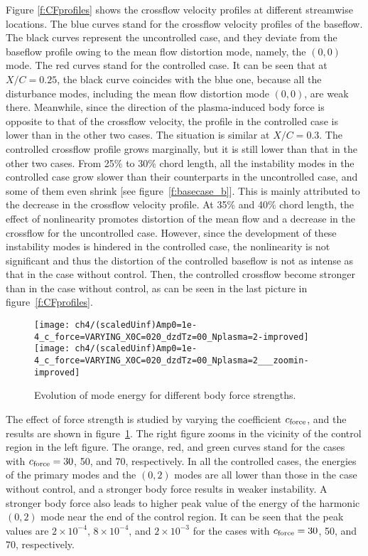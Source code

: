 Figure \ref{f:CFprofiles} shows the crossflow velocity profiles at different streamwise locations. The blue curves stand for the crossflow velocity profiles of the baseflow. The black curves represent the uncontrolled case, and they deviate from the baseflow profile owing to the mean flow distortion mode, namely, the $(0,0)$ mode. The red curves stand for the controlled case. It can be seen that at $X/C=0.25$, the black curve coincides with the blue one, because all the disturbance modes, including the mean flow distortion mode $(0,0)$, are weak there. Meanwhile, since the direction of the plasma-induced body force is  opposite to that of the crossflow velocity, the profile in the controlled case is lower than in the other two cases. The situation is similar at $X/C=0.3$. The controlled crossflow profile grows marginally, but it is still lower than that in the other two cases. From 25\% to 30\% chord length, all the instability modes in the controlled case grow slower than their counterparts in the uncontrolled case, and some of them even shrink [see figure~\ref{f:basecase_b}]. This is mainly attributed to the decrease in the crossflow velocity profile. At 35\% and 40\% chord length,  the effect of nonlinearity  promotes  distortion of  the mean flow and a decrease in the crossflow for the uncontrolled case. However, since the development of these instability modes is hindered in the controlled case, the nonlinearity is not significant and thus the distortion of the controlled baseflow is not as intense as that in the case without control. Then, the controlled crossflow become stronger than in the case without control, as can be seen in the last picture in figure~\ref{f:CFprofiles}.
\begin{figure}
\centering
\texttt{[image: ch4/(scaledUinf)Amp0=1e-4\_c\_force=VARYING\_X0C=020\_dzdTz=00\_Nplasma=2-improved]}
\texttt{[image: ch4/(scaledUinf)Amp0=1e-4\_c\_force=VARYING\_X0C=020\_dzdTz=00\_Nplasma=2\_\_\_zoomin-improved]}
\caption{Evolution of mode energy for different body force strengths.}%
\label{f:forcestrength}
\end{figure}

The effect of force strength  is studied by varying the coefficient $c_{\rm force}$, and the results are shown in figure~\ref{f:forcestrength}. The right figure zooms in the vicinity of the control region in the left figure. The orange, red, and green curves stand for the cases with $c_{\rm force}=30$, 50, and 70, respectively. In all the controlled cases, the energies of the primary modes and the $(0,2)$ modes are all lower than those in the case without control, and a stronger body force results in weaker instability. A stronger body force also leads to higher peak value of the energy of the harmonic $(0,2)$ mode near the end of the control region. It can be seen that the peak values are $2 \times 10^{-4}$, $8 \times 10^{-4}$, and  $2 \times 10^{-3}$ for the cases with $c_{\rm force}=30$, 50, and 70, respectively.

